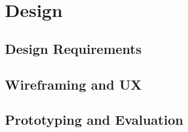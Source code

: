 \chapter{Design}
\section{Design Requirements}
\section{Wireframing and UX}
\section{Prototyping and Evaluation}
